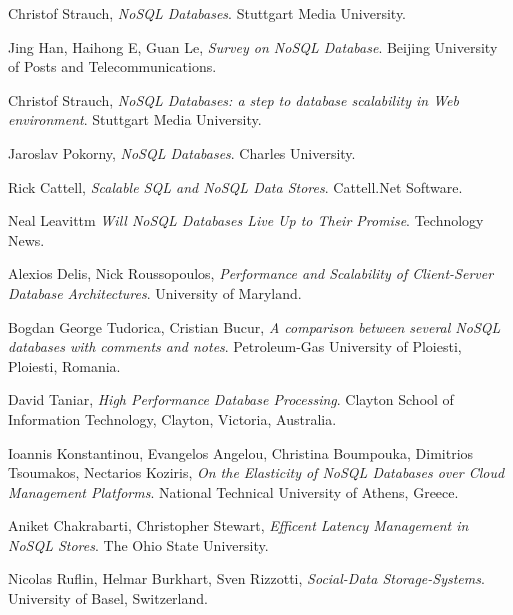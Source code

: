 \documentclass[times, 10pt,twocolumn]{article}
\newcounter{firstbib}
\begin{document}
\begin{thebibliography}{9}  

\setcounter{enumiv}{\value{firstbib}}

  	  Christof Strauch, 
      \emph{NoSQL Databases}. Stuttgart Media University.
      
  	  Jing Han, Haihong E, Guan Le,
      \emph{Survey on NoSQL Database}. Beijing University of Posts and Telecommunications.
      
  	  Christof Strauch, 
      \emph{NoSQL Databases: a step to database scalability in Web environment}. Stuttgart Media University.
      
  	   Jaroslav Pokorny, 
      \emph{NoSQL Databases}. Charles University.
      
  	  Rick Cattell, 
      \emph{Scalable SQL and NoSQL Data Stores}. Cattell.Net Software.
      
  	  Neal Leavittm 
      \emph{Will NoSQL Databases Live Up to Their Promise}. Technology News.
      
  	  Alexios Delis, Nick Roussopoulos, 
      \emph{Performance and Scalability of Client-Server Database Architectures}. University of Maryland.
      
  	  Bogdan George Tudorica, Cristian Bucur, 
      \emph{A comparison between several NoSQL databases with comments and notes}. Petroleum-Gas University of Ploiesti, Ploiesti, Romania.
      
  	  David Taniar, 
      \emph{High Performance Database Processing}. Clayton School of Information Technology, Clayton, Victoria, Australia.
      
  	  Ioannis Konstantinou, Evangelos Angelou, Christina Boumpouka, Dimitrios Tsoumakos, Nectarios Koziris, 
      \emph{On the Elasticity of NoSQL Databases over Cloud Management Platforms}. National Technical University of Athens, Greece.
      
  	  Aniket Chakrabarti, Christopher Stewart,
      \emph{Efficent Latency Management in NoSQL Stores}. The Ohio State University.
      
  	  Nicolas Ruﬂin, Helmar Burkhart, Sven Rizzotti, 
      \emph{Social-Data Storage-Systems}.  University of Basel, Switzerland.
      

\end{thebibliography}
\end{document}
